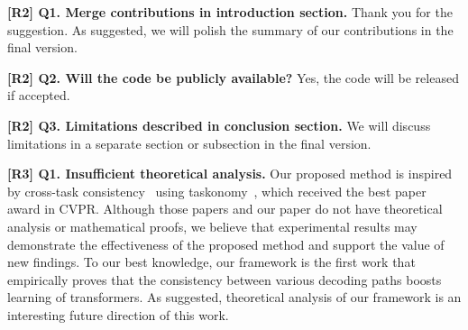 \documentclass[10pt,twocolumn,letterpaper]{article}
\newcommand{\hjk}[1]{{\color{black}#1}}
\begin{document}
\hjk{
\noindent\textbf{[R2] Q1. Merge contributions in introduction section.}\newline
Thank you for the suggestion. As suggested, we will polish the summary of our contributions in the final version.

\noindent\textbf{[R2] Q2. Will the code be publicly  available?}\newline
Yes, the code will be released if accepted.



\noindent\textbf{[R2] Q3. Limitations described in conclusion section.}\newline
We will discuss limitations in a separate section or subsection in the final version.

\noindent\textbf{[R3] Q1. Insufficient theoretical analysis.}\newline
Our proposed method is inspired by cross-task consistency~\cite{zamir2020robust} using taskonomy~\cite{zamir2018taskonomy}, which received the best paper award in CVPR.
Although those papers and our paper do not have theoretical analysis or mathematical proofs, we believe that experimental results may demonstrate the effectiveness of the proposed method and support the value of new findings. 
To our best knowledge, our framework is the first work that empirically proves that the consistency between various decoding paths boosts learning of transformers.
As suggested, theoretical analysis of our framework is an interesting future direction of this work.}
\end{document}
